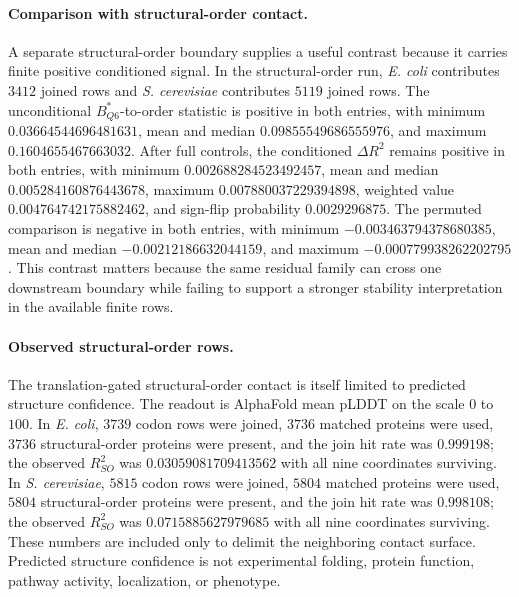 \paragraph{Comparison with structural-order contact.}
A separate structural-order boundary supplies a useful contrast because it carries finite positive conditioned signal. In the structural-order run, \emph{E. coli} contributes $3412$ joined rows and \emph{S. cerevisiae} contributes $5119$ joined rows. The unconditional $B^{\ast}_{Q6}$-to-order statistic is positive in both entries, with minimum $0.03664544696481631$, mean and median $0.09855549686555976$, and maximum $0.1604655467663032$. After full controls, the conditioned $\Delta R^2$ remains positive in both entries, with minimum $0.002688284523492457$, mean and median $0.005284160876443678$, maximum $0.007880037229394898$, weighted value $0.004764742175882462$, and sign-flip probability $0.0029296875$. The permuted comparison is negative in both entries, with minimum $-0.003463794378680385$, mean and median $-0.00212186632044159$, and maximum $-0.000779938262202795$. This contrast matters because the same residual family can cross one downstream boundary while failing to support a stronger stability interpretation in the available finite rows.

\paragraph{Observed structural-order rows.}
The translation-gated structural-order contact is itself limited to predicted structure confidence. The readout is AlphaFold mean pLDDT on the scale $0$ to $100$. In \emph{E. coli}, $3739$ codon rows were joined, $3736$ matched proteins were used, $3736$ structural-order proteins were present, and the join hit rate was $0.999198$; the observed $R^2_{SO}$ was $0.03059081709413562$ with all nine coordinates surviving. In \emph{S. cerevisiae}, $5815$ codon rows were joined, $5804$ matched proteins were used, $5804$ structural-order proteins were present, and the join hit rate was $0.998108$; the observed $R^2_{SO}$ was $0.0715885627979685$ with all nine coordinates surviving. These numbers are included only to delimit the neighboring contact surface. Predicted structure confidence is not experimental folding, protein function, pathway activity, localization, or phenotype.

